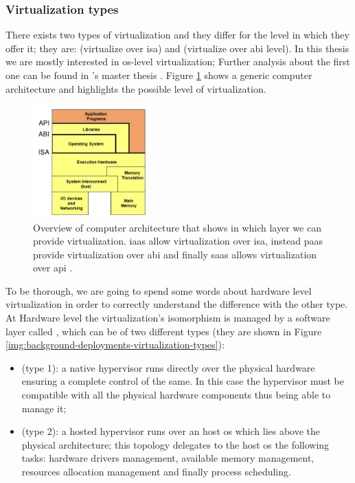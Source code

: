 \subsubsection{Virtualization types}
\label{sec:background-deployments-virtualization-types}
There exists two types of virtualization and they differ for the level in which they offer it; they
are:  (virtualize over \ac{isa}) and  (virtualize over \ac{abi} level). In this thesis we are mostly interested in 
\acs{os}-level virtualization; Further analysis about the first one can be found in
\citeauthor{gardimanThesis}'s master thesis \cite{gardimanThesis}. Figure
\ref{img:background-deployments-virtualization-assets} shows a generic computer architecture and
highlights the possible level of virtualization.

\begin{figure}[h!]
	\centering{}
	\includegraphics[width=0.4\textwidth]{chapters/background/images/computing-virtualization.png}
	\caption[Different computing virtualization levels]{Overview of computer architecture that shows in
		which layer we can provide virtualization. \acf{iaas} allow virtualization over \acf{isa}, instead
		\ac{paas} provide virtualization over \acf{abi} and finally \ac{saas} allows virtualization over
		\acf{api} \cite{virtualizationLevel}.}
	\label{img:background-deployments-virtualization-assets}
\end{figure}

To be thorough, we are going to spend some words about hardware level virtualization in order to correctly
understand the difference with the other type. At Hardware level the virtualization's isomorphism is managed
by a software layer called , which can be of two different types (they are shown in
Figure \ref{img:background-deployments-virtualization-types}):

\begin{itemize}
	\item{ (type 1): a native hypervisor runs directly over the physical hardware ensuring
		a complete control of the same. In this case the hypervisor must be compatible with all the physical
		hardware components thus being able to manage it;}
	\item{ (type 2): a hosted hypervisor runs over an host \acs{os} which lies above the
		physical architecture; this topology delegates to the host \acs{os} the following tasks: hardware
		drivers management, available memory management, resources allocation management and finally process
		scheduling.}
\end{itemize}

